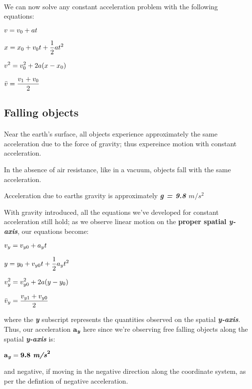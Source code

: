 \documentclass[12pt, a4paper]{article}
\begin{document}
\paragraph*{}
We can now solve any constant acceleration problem with the following equations:

{
    \centering
    $\mathlarger{v = v_0 + at}$

    $\mathlarger{x = x_0 + v_0t + \frac{1}{2}at^2}$

    $\mathlarger{v^2 = v_0^2 + 2a(x-x_0)}$

    $\mathlarger{\bar v = \frac{v_1 + v_0}{2}}$

}

\subsection{Falling objects}
\paragraph*{}
Near the earth's surface, all objects experience approximately the same acceleration
due to the force of gravity; thus expereince motion with constant acceleration.

In the absence of air resistance, like in a vacuum, objects fall with the same  acceleration.

Acceleration due to earths gravity is approximately \textbf{\textit{g = 9.8 $m/s^2$}}

With gravity introduced, all the equations we've developed for constant acceleration still hold; as 
we observe linear motion on the \textbf{proper spatial \textit{y-axis}}, our equations become:

{
    \centering
    $\mathlarger{v_y = v_{y0} + a_yt}$

    $\mathlarger{y = y_0 + v_{y0}t + \frac{1}{2}a_yt^2}$

    $\mathlarger{v_y^2 = v_{y0}^2 + 2a(y-y_0)}$

    $\mathlarger{\bar v_y = \frac{v_{y1} + v_{y0}}{2}}$

}

where the \textbf{\textit{y}} subscript represents the quantities observed on the spatial \textbf{\textit{y-axis}}. Thus,
our acceleration $\textrm{\textbf{a}}_\textrm{\textbf{\textit{y}}}$ here since we're observing free falling objects along the spatial \textbf{\textit{y-axis}}
is:

{
    \centering
    $\textrm{\textbf{a}}_\textrm{\textbf{\textit{y}}} = \textrm{\textbf{9.8
    \textit{m/s}}}^\textrm{\textbf{2}}$

}

and negative, if moving in the negative direction along the coordinate system, as per the defintion of
negative acceleration.
\end{document}
